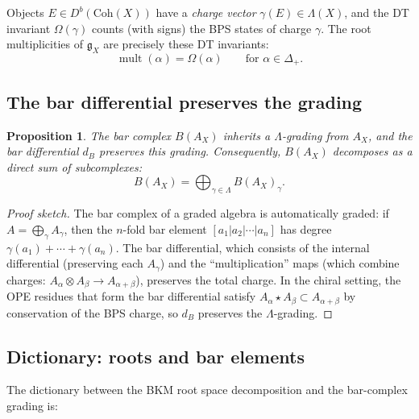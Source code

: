 \documentclass[11pt]{article}
\newtheorem{proposition}[theorem]{Proposition}
\theoremstyle{definition}
\theoremstyle{remark}
\DeclareMathOperator{\mult}{mult}
\newcommand{\frakg}{\mathfrak{g}}
\begin{document}
Objects $E \in D^b(\mathrm{Coh}(X))$ have a \emph{charge vector}
$\gamma(E) \in \Lambda(X)$, and the DT invariant $\Omega(\gamma)$
counts (with signs) the BPS states of charge $\gamma$. The root
multiplicities of $\frakg_X$ are precisely these DT invariants:
\begin{equation}
\label{eq:mult-dt}
 \mult(\alpha) = \Omega(\alpha)
 \qquad\text{for } \alpha \in \Delta_+.
\end{equation}

\subsection{The bar differential preserves the grading}

\begin{proposition}
\label{prop:bar-grading}
The bar complex $B(A_X)$ inherits a $\Lambda$-grading from $A_X$, and
the bar differential $d_B$ preserves this grading. Consequently,
$B(A_X)$ decomposes as a direct sum of subcomplexes:
\[
 B(A_X) = \bigoplus_{\gamma \in \Lambda} B(A_X)_\gamma.
\]
\end{proposition}

\begin{proof}[Proof sketch]
The bar complex of a graded algebra is automatically graded: if $A = \bigoplus_\gamma A_\gamma$, then the $n$-fold bar element
$[a_1 | a_2 | \cdots | a_n]$ has degree $\gamma(a_1) + \cdots + \gamma(a_n)$.
The bar differential, which consists of the internal differential
(preserving each $A_\gamma$) and the ``multiplication'' maps (which combine
charges: $A_\alpha \otimes A_\beta \to A_{\alpha+\beta}$), preserves
the total charge. In the chiral setting, the OPE residues that form the
bar differential satisfy $A_\alpha \star A_\beta \subset A_{\alpha+\beta}$
by conservation of the BPS charge, so $d_B$ preserves the $\Lambda$-grading.
\end{proof}

\subsection{Dictionary: roots and bar elements}

The dictionary between the BKM root space decomposition and the bar-complex
grading is:
\end{document}
